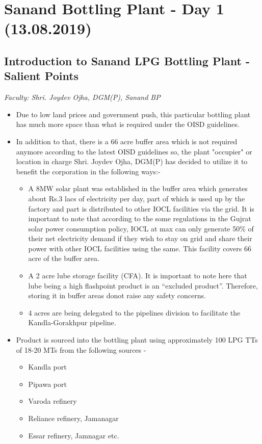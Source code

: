 \documentclass{report}
\begin{document}
	\section{Sanand Bottling Plant - Day 1 (13.08.2019)}
	
	\subsection{Introduction to Sanand LPG Bottling Plant - Salient Points}
	\textit{Faculty: Shri. Joydev Ojha, DGM(P), Sanand BP}
	\begin{itemize}
		\item Due to low land prices and government push, this particular bottling plant has much more space than what is required under the OISD guidelines.
		\item In addition to that, there is a 66 acre buffer area which is not required anymore according to the latest OISD guidelines so, the plant "occupier" or location in charge Shri. Joydev Ojha, DGM(P) has decided to utilize it to benefit the corporation in the following ways:-
		\begin{itemize}
			\item A 8MW solar plant was established in the buffer area which generates about Rs.3 lacs of electricity per day, part of which is used up by the factory and part is distributed to other IOCL facilities via the grid. It is important to note that according to the some regulations in the Gujrat solar power consumption policy, IOCL at max can only generate 50\% of their net electricity demand if they wish to stay on grid and share their power with other IOCL facilities using the same. This facility covers 66 acre of the buffer area. 
			
			\item  A 2 acre lube storage facility (CFA). It is important to note here that lube being a high flashpoint product is an ``excluded product''. Therefore, storing it in buffer areas donot raise any safety concerns.
			
			\item 4 acres are being delegated to the pipelines division to facilitate the Kandla-Gorakhpur pipeline.
			
			
		\end{itemize}
		\item Product is sourced into the bottling plant using approximately 100 LPG TTs of 18-20 MTs from the following sources -
		\begin{itemize}
			\item Kandla port
			\item Pipawa port
			\item Varoda refinery
			\item Reliance refinery, Jamanagar
			\item Essar refinery, Jamnagar etc.
		\end{itemize}
	

\end{itemize}
\end{document}
